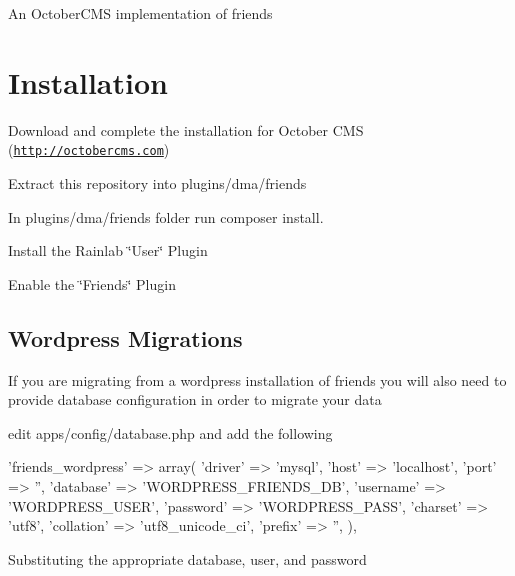 An October\-C\-M\-S implementation of friends

\section*{Installation}


\begin{DoxyItemize}
\item Download and complete the installation for October C\-M\-S (\href{http://octobercms.com}{\tt http\-://octobercms.\-com})
\item Extract this repository into plugins/dma/friends
\item In plugins/dma/friends folder run {\ttfamily composer install}.
\item Install the Rainlab \char`\"{}\-User\char`\"{} Plugin
\item Enable the \char`\"{}\-Friends\char`\"{} Plugin
\end{DoxyItemize}

\subsection*{Wordpress Migrations}

If you are migrating from a wordpress installation of friends you will also need to provide database configuration in order to migrate your data


\begin{DoxyItemize}
\item edit apps/config/database.\-php and add the following 
\begin{DoxyPre}
        'friends\_wordpress' => array(
            'driver'    => 'mysql',
            'host'      => 'localhost',
            'port'      => '', 
            'database'  => 'WORDPRESS\_FRIENDS\_DB',
            'username'  => 'WORDPRESS\_USER',
            'password'  => 'WORDPRESS\_PASS',
            'charset'   => 'utf8',
            'collation' => 'utf8\_unicode\_ci',
            'prefix'    => '', 
        ), 
\end{DoxyPre}
 Substituting the appropriate database, user, and password 
\end{DoxyItemize}